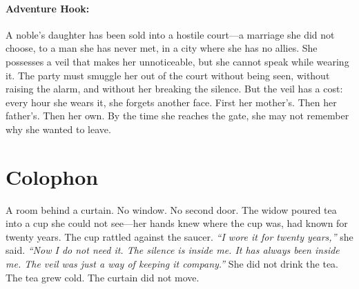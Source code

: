 \paragraph{Adventure Hook:}
A noble's daughter has been sold into a hostile court---a marriage she did not choose, to a man she has never met, in a city where she has no allies. She possesses a veil that makes her unnoticeable, but she cannot speak while wearing it. The party must smuggle her out of the court without being seen, without raising the alarm, and without her breaking the silence. But the veil has a cost: every hour she wears it, she forgets another face. First her mother's. Then her father's. Then her own. By the time she reaches the gate, she may not remember why she wanted to leave.

\section*{Colophon}
A room behind a curtain. No window. No second door. The widow poured tea into a cup she could not see---her hands knew where the cup was, had known for twenty years. The cup rattled against the saucer. \textit{``I wore it for twenty years,''} she said. \textit{``Now I do not need it. The silence is inside me. It has always been inside me. The veil was just a way of keeping it company.''} She did not drink the tea. The tea grew cold. The curtain did not move.